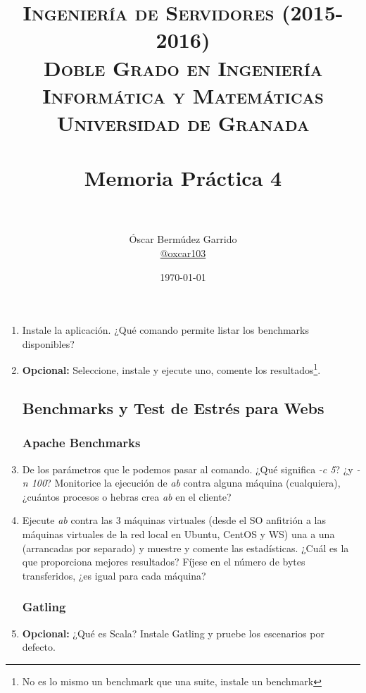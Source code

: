 \documentclass[paper=a4, fontsize=11pt]{scrartcl} %
\title{	
\normalfont \normalsize 
\textsc{{\bf Ingeniería de Servidores (2015-2016)} \\ Doble Grado en Ingeniería Informática y Matemáticas \\ Universidad de Granada} \\ [25pt] %
\horrule{0.5pt} \\[0.4cm] %
\huge Memoria Práctica 4 \\ %
\horrule{2pt} \\[0.5cm] %
}
\author{Óscar Bermúdez Garrido\\ \href{http://www.github.com/oxcar103}{@oxcar103}} %
\date{\normalsize\today} %
\numberwithin{equation}{section} %
\numberwithin{figure}{section} %
\numberwithin{table}{section} %
\begin{document}
\maketitle %
\newpage %
\tableofcontents %
\listoffigures

\begin{enumerate}
	\section{Benchmarks populares}
	\subsection{Phoronix Suite}
		\item Instale la aplicación. ¿Qué comando permite listar los benchmarks disponibles?
		
		\item \textbf{Opcional:} Seleccione, instale y ejecute uno, comente los resultados\footnote{No
		es lo mismo un benchmark que una suite, instale un benchmark}.
		
	\subsection{Benchmarks y Test de Estrés para Webs}
	\subsubsection{Apache Benchmarks}
		\item De los parámetros que le podemos pasar al comando. ¿Qué significa \textit{-c 5}?
		¿y \textit{-n 100}? Monitorice la ejecución de \textit{ab} contra alguna máquina (cualquiera),
		¿cuántos procesos o hebras crea \textit{ab} en el cliente?
		
		\item Ejecute \textit{ab} contra las 3 máquinas virtuales (desde el SO anfitrión a las máquinas
		virtuales de la red local en Ubuntu, CentOS y WS) una a una (arrancadas por separado) y muestre
		y comente las estadísticas. ¿Cuál es la que proporciona mejores resultados? Fíjese en el número
		de bytes transferidos, ¿es igual para cada máquina?
		
	\subsubsection{Gatling}
		\item \textbf{Opcional:} ¿Qué es Scala? Instale Gatling y pruebe los escenarios por defecto.
		

\end{enumerate}
\end{document}
